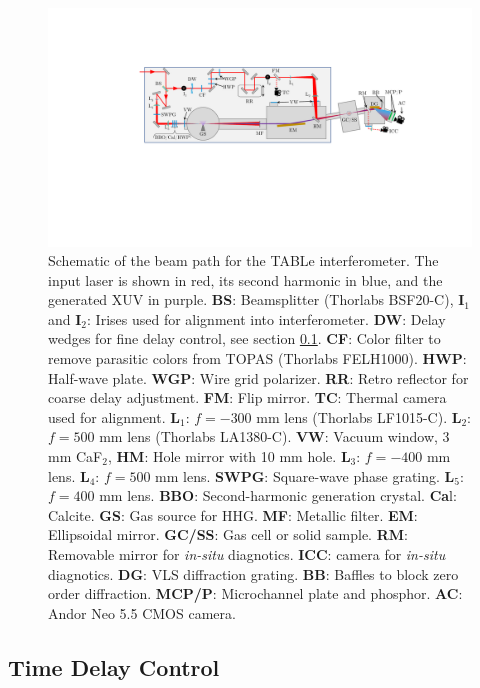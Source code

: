 \begin{figure}
	\centering
	\includegraphics[width=1.0\textwidth]{figures/Beamline/beampath_sketch_3.pdf}
	\caption[Schematic of TABLe optical layout.]{Schematic of the beam path for the TABLe interferometer. The input laser is shown in red, its second harmonic in  blue, and the generated XUV in purple.  \textbf{BS}: Beamsplitter (Thorlabs BSF20-C), \textbf{I$_1$} and \textbf{I$_2$}: Irises used for alignment into interferometer. \textbf{DW}: Delay wedges for fine delay control, see section \ref{sec:delay_wedges}. \textbf{CF}: Color filter to remove parasitic colors from TOPAS (Thorlabs FELH1000). \textbf{HWP}: Half-wave plate. \textbf{WGP}: Wire grid polarizer. \textbf{RR}: Retro reflector for coarse delay adjustment.  \textbf{FM}: Flip mirror. \textbf{TC}: Thermal camera used for alignment.  \textbf{L$_1$}: $f=-300$ mm lens (Thorlabs LF1015-C). \textbf{L$_2$}: $f=500$ mm lens (Thorlabs LA1380-C). \textbf{VW}: Vacuum window, 3 mm CaF$_2$, \textbf{HM}: Hole mirror with 10 mm hole.  \textbf{L$_3$}: $f=-400$ mm lens.  \textbf{L$_4$}: $f=500$ mm lens. \textbf{SWPG}: Square-wave phase grating. \textbf{L$_5$}: $f=400$ mm lens.  \textbf{BBO}: Second-harmonic generation crystal.  \textbf{Ca}l: Calcite. \textbf{GS}: Gas source for HHG. \textbf{MF}: Metallic filter. \textbf{EM}: Ellipsoidal mirror. \textbf{GC/SS}: Gas cell or solid sample. \textbf{RM}: Removable mirror for \textit{in-situ} diagnotics.    \textbf{ICC}: camera for \textit{in-situ} diagnotics. \textbf{DG}: VLS diffraction grating. \textbf{BB}: Baffles to block zero order diffraction.  \textbf{MCP/P}: Microchannel plate and phosphor.  \textbf{AC}: Andor Neo 5.5 CMOS camera.}
	\label{fig:beampath_sketch}
\end{figure}


\subsection{Time Delay Control}
\label{sec:delay_wedges}

